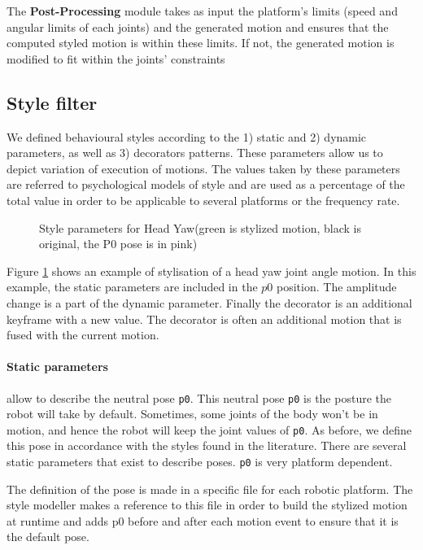 \documentclass[smallextended]{svjour3}
\begin{document}
The \textbf{Post-Processing} module takes as input the platform's limits (speed and angular limits of each joints) and the generated motion and ensures that the computed styled motion is within these limits.
If not, the generated motion is modified to fit within the joints' constraints


\subsection{Style filter}
\label{ssec:bss}
We defined behavioural styles according to the 1) static and 2) dynamic parameters, as well as 3) decorators patterns. 
These parameters allow us to depict variation of execution of motions.
The values taken by these parameters are referred to psychological models of style and are used as a percentage of the total value in order to be applicable to several platforms or the frequency rate.
\begin{figure}
	\centering
	\caption{Style parameters for Head Yaw(green is stylized motion, black is original, the P0 pose is in pink)}
	\label{fig:styles_parameters}
\end{figure}
Figure \ref{fig:styles_parameters} shows an example of stylisation of a head yaw joint angle motion.
In this example, the static parameters are included in the $p0$ position.
The amplitude change is a part of the dynamic parameter. 
Finally the decorator is an additional keyframe with a new value. 
The decorator is often an additional motion that is fused with the current motion.

\paragraph{Static parameters} allow to describe the neutral pose \texttt{p0}. 
This neutral pose \texttt{p0} is the posture the robot will take by default.
Sometimes, some joints of the body won't be in motion,  and hence the robot will keep the joint values of \texttt{p0}.
As before, we define this pose in accordance with the styles found in the literature. 
There are several static parameters that exist to describe poses. 
\texttt{p0} is very platform dependent. 

The definition of the pose is made in a specific file for each robotic platform. 
The style modeller makes a reference to this file in order to build the stylized motion at runtime and adds p0 before and after each motion event to ensure that it is the default pose.
\end{document}
